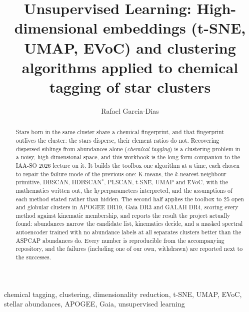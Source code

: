 \documentclass{ar-1col}
\makeatletter
\renewcommand\tableofcontents{%
  \section*{\contentsname}%
  \@starttoc{toc}}
\makeatother
\begin{document}

\title{Unsupervised Learning: High-dimensional embeddings (t-SNE, UMAP,
EVoC) and clustering algorithms applied to chemical tagging of star clusters}

\author{Rafael Garcia-Dias}

\begin{abstract} Stars born in the same cluster share a chemical fingerprint,
and that fingerprint outlives the cluster: the stars disperse, their element
ratios do not. Recovering dispersed siblings from abundances alone
(\emph{chemical tagging}) is a clustering problem in a noisy, high-dimensional
space, and this workbook is the long-form companion to the IAA-SO 2026 lecture
on it. It builds the toolbox one algorithm at a time, each chosen to repair the
failure mode of the previous one: K-means, the $k$-nearest-neighbour primitive,
DBSCAN, HDBSCAN$^*$, PLSCAN, t-SNE, UMAP and EVoC, with the mathematics written
out, the hyperparameters interpreted, and the assumptions of each method stated
rather than hidden. The second half applies the toolbox to 25 open and globular
clusters in APOGEE DR19, Gaia DR3 and GALAH DR4, scoring every method against
kinematic membership, and reports the result the project actually found:
abundances narrow the candidate list, kinematics decide, and a masked spectral
autoencoder trained with no abundance labels at all separates clusters better
than the ASPCAP abundances do. Every number is reproducible from the
accompanying repository, and the failures (including one of our own, withdrawn)
are reported next to the successes.
\end{abstract}

\begin{keywords}
chemical tagging, clustering, dimensionality reduction, t-SNE, UMAP, EVoC,
stellar abundances, APOGEE, Gaia, unsupervised learning
\end{keywords}

\maketitle

\tableofcontents





















\end{document}
